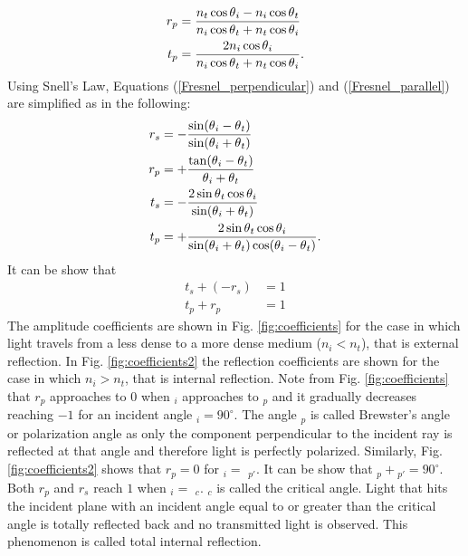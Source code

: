 \begin{equation}\label{Fresnel_parallel}
\begin{split}
r_{p} & = \frac{n_t\cos\mbox{$\theta$}_i-n_i \cos\mbox{$\theta$}_t}{n_i \cos\mbox{$\theta$}_t+n_t\cos\mbox{$\theta$}_i}\\
t_{p} & =  \frac{2n_i\cos\mbox{$\theta$}_i}{n_i\cos\mbox{$\theta$}_t+n_t\cos\mbox{$\theta$}_i}.
\end{split}
\end{equation}
Using Snell's Law, Equations (\ref{Fresnel_perpendicular}) and (\ref{Fresnel_parallel}) are simplified as in the following:
\begin{equation} \label{simple_Fresnel}
\begin{split}
r_{s} & = -\frac{\sin(\mbox{$\theta$}_i-\mbox{$\theta$}_t)}{\sin(\mbox{$\theta$}_i+\mbox{$\theta$}_t)}\\
r_{p} & =  +\frac{\tan(\mbox{$\theta$}_i-\mbox{$\theta$}_t)}{\mbox{$\theta$}_i+\mbox{$\theta$}_t}\\
t_{s} & = -\frac{2\sin \mbox{$\theta$}_t \cos \mbox{$\theta$}_i}{\sin(\mbox{$\theta$}_i+\mbox{$\theta$}_t)}\\
t_{p} & = +\frac{2\sin \mbox{$\theta$}_t \cos \mbox{$\theta$}_i}{\sin(\mbox{$\theta$}_i+\mbox{$\theta$}_t)\cos(\mbox{$\theta$}_i- \mbox{$\theta$}_t)}.
\end{split}
\end{equation}
It can be show that
 \begin{equation}
\begin{split}
t_s+(-r_s) &= 1 \\
t_p+r_p &=  1
\end{split}
\end{equation}
The amplitude coefficients are shown in Fig. \ref{fig:coefficients} for the case in which light travels from a less dense to a more dense medium ($n_i<n_t$), that is external reflection. 
In Fig. \ref{fig:coefficients2} the reflection coefficients are shown for the case in which $n_i>n_t$, that is internal reflection. Note from Fig. \ref{fig:coefficients} that $r_p$ approaches to $0$ when \myangle$_i$ approaches to \myangle$_p$ and it gradually decreases reaching $-1$ for an incident angle \myangle$_i=90^\circ$. The angle \myangle$_p$ is called Brewster's angle or polarization angle as only the component perpendicular to the incident ray is reflected at that angle and therefore light is perfectly polarized. Similarly, Fig. \ref{fig:coefficients2} shows that $r_p=0$ for \myangle$_i= $ \myangle$_{p\prime}$. It can be show that \myangle$_p+ $\myangle$_{p\prime}= 90^\circ$. Both $r_p$ and $r_s$ reach $1$ when \myangle$_i= $ \myangle$_c$. \myangle$_c$ is called the critical angle. Light that hits the incident plane with an incident angle equal to or greater than the critical angle is totally reflected back and no transmitted light is observed. This phenomenon is called total internal reflection. 
